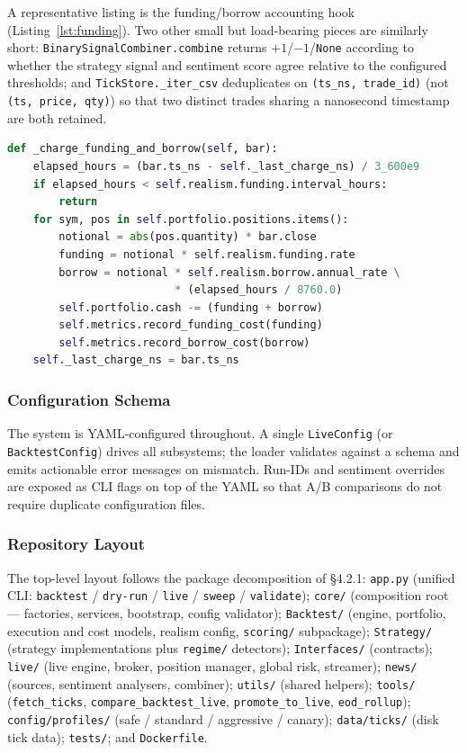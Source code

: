 \documentclass[a4paper, 12pt, titlepage]{article}
\begin{document}
A representative listing is the funding/borrow accounting hook
(Listing~\ref{lst:funding}). Two other small but load-bearing
pieces are similarly short: \texttt{BinarySignalCombiner.combine}
returns $+1$/$-1$/\texttt{None} according to whether the strategy
signal and sentiment score agree relative to the configured
thresholds; and \texttt{TickStore.\_iter\_csv} deduplicates on
\texttt{(ts\_ns, trade\_id)} (not \texttt{(ts, price, qty)}) so
that two distinct trades sharing a nanosecond timestamp are both
retained.

\begin{lstlisting}[language=Python,caption={Funding and borrow accounting in the backtest engine.},label={lst:funding}]
def _charge_funding_and_borrow(self, bar):
    elapsed_hours = (bar.ts_ns - self._last_charge_ns) / 3_600e9
    if elapsed_hours < self.realism.funding.interval_hours:
        return
    for sym, pos in self.portfolio.positions.items():
        notional = abs(pos.quantity) * bar.close
        funding = notional * self.realism.funding.rate
        borrow = notional * self.realism.borrow.annual_rate \
                          * (elapsed_hours / 8760.0)
        self.portfolio.cash -= (funding + borrow)
        self.metrics.record_funding_cost(funding)
        self.metrics.record_borrow_cost(borrow)
    self._last_charge_ns = bar.ts_ns
\end{lstlisting}

\subsubsection{Configuration Schema}

The system is YAML-configured throughout. A single
\texttt{LiveConfig} (or \texttt{BacktestConfig}) drives all subsystems;
the loader validates against a schema and emits actionable error
messages on mismatch. Run-IDs and sentiment overrides are exposed as
CLI flags on top of the YAML so that A/B comparisons do not require
duplicate configuration files.

\subsubsection{Repository Layout}

The top-level layout follows the package decomposition of \S 4.2.1:
\texttt{app.py} (unified CLI: \texttt{backtest} / \texttt{dry-run}
/ \texttt{live} / \texttt{sweep} / \texttt{validate});
\texttt{core/} (composition root --- factories, services,
bootstrap, config validator); \texttt{Backtest/} (engine,
portfolio, execution and cost models, realism config, \texttt{scoring/}
subpackage); \texttt{Strategy/} (strategy implementations plus
\texttt{regime/} detectors); \texttt{Interfaces/} (contracts);
\texttt{live/} (live engine, broker, position manager, global
risk, streamer); \texttt{news/} (sources, sentiment analysers,
combiner); \texttt{utils/} (shared helpers); \texttt{tools/}
(\texttt{fetch\_ticks}, \texttt{compare\_backtest\_live},
\texttt{promote\_to\_live}, \texttt{eod\_rollup});
\texttt{config/profiles/} (safe / standard / aggressive / canary);
\texttt{data/ticks/} (disk tick data); \texttt{tests/}; and
\texttt{Dockerfile}.
\end{document}
